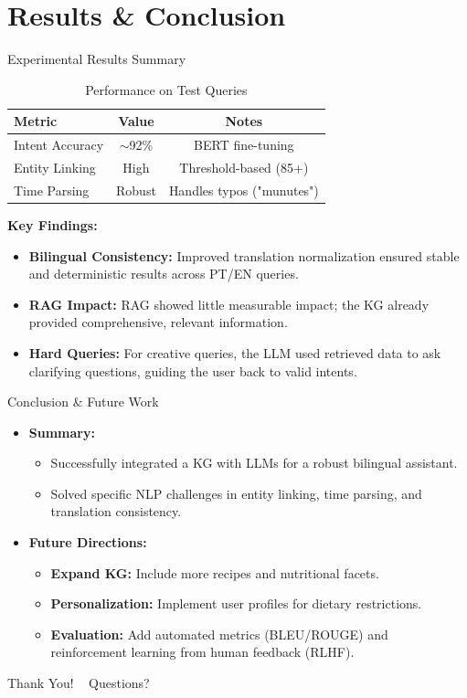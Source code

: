 \documentclass[t, 10pt, handout, aspectratio=169]{beamer}
\begin{document}
\section{Results \& Conclusion}
\begin{frame}{Experimental Results Summary}
  \begin{table}
    \centering
    \caption{Performance on Test Queries}
    \begin{tabular}{lcc}
      \toprule
      \textbf{Metric} & \textbf{Value} & \textbf{Notes} \\
      \midrule
      Intent Accuracy & $\sim$92\% & BERT fine-tuning \\
      Entity Linking & High & Threshold-based (85+) \\
      Time Parsing & Robust & Handles typos ("munutes") \\
      \bottomrule
    \end{tabular}
  \end{table}

  \vspace{1em}
  \textbf{Key Findings:}
  \begin{itemize}
    \item \textbf{Bilingual Consistency:} Improved translation normalization ensured stable and deterministic results across PT/EN queries.
    \item \textbf{RAG Impact:} RAG showed little measurable impact; the KG already provided comprehensive, relevant information.
    \item \textbf{Hard Queries:} For creative queries, the LLM used retrieved data to ask clarifying questions, guiding the user back to valid intents.
  \end{itemize}
\end{frame}

\begin{frame}{Conclusion \& Future Work}
  \begin{itemize}
    \item \textbf{Summary:}
      \begin{itemize}
        \item Successfully integrated a KG with LLMs for a robust bilingual assistant.
        \item Solved specific NLP challenges in entity linking, time parsing, and translation consistency.
      \end{itemize}
    
    \vspace{1em}
    \item \textbf{Future Directions:}
      \begin{itemize}
        \item \textbf{Expand KG:} Include more recipes and nutritional facets.
        \item \textbf{Personalization:} Implement user profiles for dietary restrictions.
        \item \textbf{Evaluation:} Add automated metrics (BLEU/ROUGE) and reinforcement learning from human feedback (RLHF).
      \end{itemize}
  \end{itemize}
\end{frame}

\begin{frame}[plain]

\centering
\Huge \textcolor{structure.fg}{Thank You!} \
\vspace{1em}
\large Questions?
\end{frame}
\end{document}
